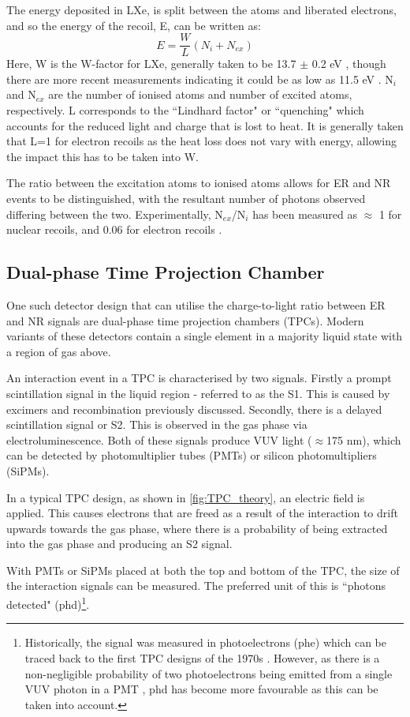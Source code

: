 \par
The energy deposited in LXe, is split between the atoms and liberated electrons, and so the energy of the recoil, E, can be written as:
\begin{equation}
    E = \frac{W}{L}(N_i + N_{ex})
\end{equation}
Here, W is the W-factor for LXe, generally taken to be 13.7 $\pm$ 0.2 eV \cite{light_and_charge_of_xenon_ref}, though there are more recent measurements indicating it could be as low as 11.5 eV \cite{electron_excitation_energy_of_xenon_ref}. 
N$_i$ and N$_{ex}$ are the number of ionised atoms and number of excited atoms, respectively.
L corresponds to the ``Lindhard factor" or ``quenching" which accounts for the reduced light and charge that is lost to heat.
It is generally taken that L=1 for electron recoils as the heat loss does not vary with energy, allowing the impact this has to be taken into W.
\par
The ratio between the excitation atoms to ionised atoms allows for ER and NR events to be distinguished, with the resultant number of photons observed differing between the two.
Experimentally, N$_{ex}$/N$_i$ has been measured as $\approx$ 1 for nuclear recoils, and 0.06 for electron recoils \cite{ionisation_to_excitation_ratio_xenon_ref}.

\subsection{Dual-phase Time Projection Chamber}
\par
One such detector design that can utilise the charge-to-light ratio between ER and NR signals are dual-phase time projection chambers (TPCs).
Modern variants of these detectors contain a single element in a majority liquid state with a region of gas above.
\par
An interaction event in a TPC is characterised by two signals.
Firstly a prompt scintillation signal in the liquid region - referred to as the S1.
This is caused by excimers and recombination previously discussed.
Secondly, there is a delayed scintillation signal or S2.
This is observed in the gas phase via electroluminescence.
Both of these signals produce VUV light ($\approx$175 nm), which can be detected by photomultiplier tubes (PMTs) or silicon photomultipliers (SiPMs).
\par
In a typical TPC design, as shown in \autoref{fig:TPC_theory}, an electric field is applied.
This causes electrons that are freed as a result of the interaction to drift upwards towards the gas phase, where there is a probability of being extracted into the gas phase and producing an S2 signal.
\par
With PMTs or SiPMs placed at both the top and bottom of the TPC, the size of the interaction signals can be measured.
The preferred unit of this is ``photons detected" (phd)\footnote{Historically, the signal was measured in photoelectrons (phe) which can be traced back to the first TPC designs of the 1970s \cite{tpc_origins_ref}. However, as there is a non-negligible probability of two photoelectrons being emitted from a single VUV photon in a PMT \cite{pmts_in_xenon_ref}, phd has become more favourable as this can be taken into account.}.

